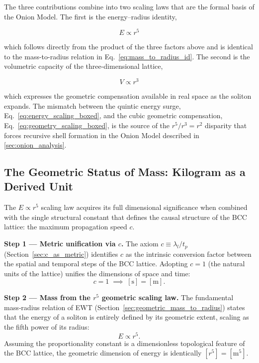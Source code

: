 \documentclass[10pt,a4paper]{article}
\begin{document}
The three contributions combine into two scaling laws that are the formal
basis of the Onion Model. The first is the energy--radius identity,

\begin{equation}
	\boxed{ E \propto r^5 }
	\label{eq:energy_scaling_boxed}
\end{equation}

which follows directly from the product of the three factors above and is
identical to the mass-to-radius relation in
Eq.~\eqref{eq:mass_to_radius_id}. The second is the volumetric capacity
of the three-dimensional lattice,

\begin{equation}
	\boxed{ V \propto r^3 }
	\label{eq:geometry_scaling_boxed}
\end{equation}

which expresses the geometric compensation available in real space as the
soliton expands. The mismatch between the quintic energy surge, Eq.~\eqref{eq:energy_scaling_boxed},
and the cubic geometric compensation, Eq.~\eqref{eq:geometry_scaling_boxed},
is the source of the \(r^5/r^3 = r^2\) disparity that forces recursive shell
formation in the Onion Model described in \ref{sec:onion_analysis}.

\subsection{The Geometric Status of Mass: Kilogram as a Derived Unit}
\label{sec:mass_geometric_status}

The $E \propto r^5$ scaling law acquires its full dimensional
significance when combined with the single structural constant
that defines the causal structure of the BCC lattice: the
maximum propagation speed $c$.

\textbf{Step 1 — Metric unification via $c$.}
The axiom $c \equiv \lambda_l / t_p$
(Section~\ref{sec:c_as_metric}) identifies $c$ as the intrinsic
conversion factor between the spatial and temporal steps of the
BCC lattice.  Adopting $c = 1$ (the natural units of the
lattice) unifies the dimensions of space and time:
\begin{equation}
	c = 1 \;\implies\; [\text{s}] = [\text{m}].
\end{equation}

\textbf{Step 2 — Mass from the $r^5$ geometric scaling law.}
The fundamental mass‑radius relation of EWT
(Section~\ref{sec:geometric_mass_to_radius}) states that the
energy of a soliton is entirely defined by its geometric extent,
scaling as the fifth power of its radius:
\begin{equation}
	E \propto r^5 .
\end{equation}
Assuming the proportionality constant is a dimensionless
topological feature of the BCC lattice, the geometric dimension
of energy is identically $[r^5] = [\text{m}^5]$.
\end{document}
